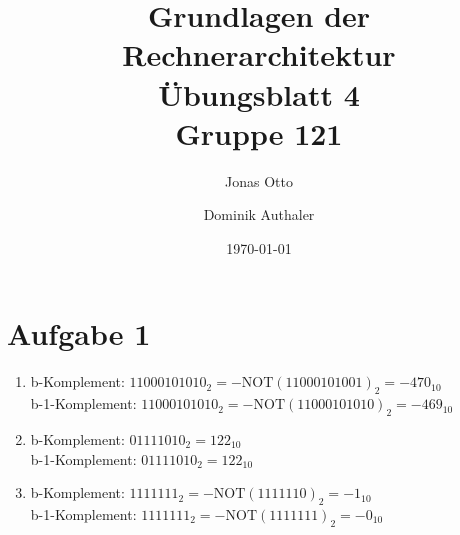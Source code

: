 \documentclass[a4paper]{article}
\title{Grundlagen der Rechnerarchitektur\\ Übungsblatt 4\\Gruppe 121\\}
\author{Jonas Otto\and Dominik Authaler}
\date{\today}
\begin{document}
\maketitle

\section*{Aufgabe 1}
\begin{enumerate}[label=\alph*)]
\item b-Komplement: $11000101010_2 = -\text{NOT}(11000101001)_2 = -470_{10}$ \\
      b-1-Komplement: $11000101010_2 = -\text{NOT}(11000101010)_2 = -469_{10}$
\item b-Komplement: $01111010_2 = 122_{10}$ \\
      b-1-Komplement: $01111010_2 = 122_{10}$
\item b-Komplement: $1111111_2 = -\text{NOT}(1111110)_2 = -1_{10}$ \\
      b-1-Komplement: $1111111_2 = -\text{NOT}(1111111)_2 = -0_{10}$
\end{enumerate}
\end{document}
